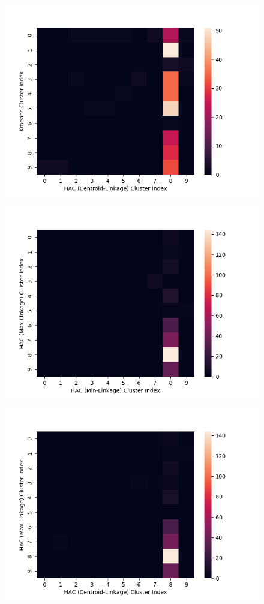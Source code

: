 \documentclass[submit]{harvardml}
\begin{document}
\begin{enumerate}
\begin{figure}[h!]
            \includegraphics[height=0.4\textheight]{HW4/heatmap3.png}
        \end{figure}
    \begin{figure}[h!]
            \centering
            \includegraphics[height=0.4\textheight]{HW4/heatmap4.png}
        \end{figure}
    \begin{figure}[h!]
            \centering
            \includegraphics[height=0.4\textheight]{HW4/heatmap5.png}

\end{figure}
\end{enumerate}
\end{document}
